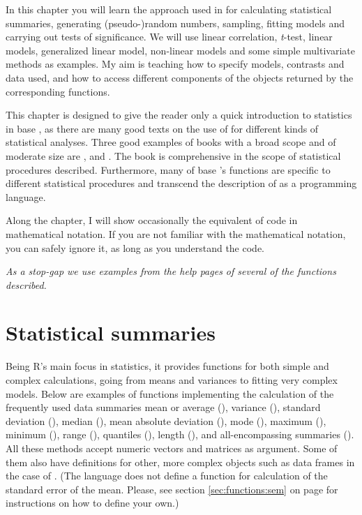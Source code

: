 \documentclass[krantz2]{krantz}\usepackage{knitr}%
\begin{document}
In this chapter you will learn the approach used in \Rlang for calculating statistical summaries, generating (pseudo-)random numbers, sampling, fitting models and carrying out tests of significance. We will use linear correlation, \emph{t}-test, linear models, generalized linear model, non-linear models and some simple multivariate methods as examples. My aim is teaching how to specify models, contrasts and data used, and how to access different components of the objects returned by the corresponding functions.

This chapter is designed to give the reader only a quick introduction to statistics in base \Rlang, as there are many good texts on the use of \Rpgrm for different kinds of statistical analyses. Three good examples of books with a broad scope and of moderate size are  \autocite{Dalgaard2008},  \autocite{Everitt2009} and  \autocite{??}. The book  \autocite{Crawley2012} is comprehensive in the scope of statistical procedures described. Furthermore, many of base \R's functions are specific to different statistical procedures and transcend the description of \Rlang as a programming language.

Along the chapter, I will show occasionally the equivalent of \Rlang code in mathematical notation. If you are not familiar with the mathematical notation, you can safely ignore it, as long as you understand the \Rlang code.

\emph{\textcolor[rgb]{1.00,0.50,0.25}{As a stop-gap we use examples from the help pages of several of the functions described.}}

\section{Statistical summaries}
Being R's main focus in statistics, it provides functions for both simple and complex calculations, going from means and variances to fitting very complex models. Below are examples of functions implementing the calculation of the frequently used data summaries mean or average (), variance (), standard deviation (), median (), mean absolute deviation (), mode (), maximum (), minimum (), range (), quantiles (), length (), and all-encompassing summaries (). All these methods accept numeric vectors and matrices as argument. Some of them also have definitions for other, more complex objects such as data frames in the case of . (The \Rlang language does not define a function for calculation of the standard error of the mean. Please, see section \ref{sec:functions:sem} on page \pageref{sec:functions:sem} for instructions on how to define your own.)
\end{document}
